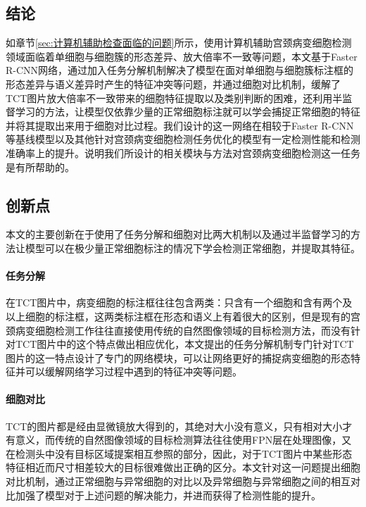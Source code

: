 \subsection{结论}
\par 如章节\ref{sec:计算机辅助检查面临的问题}所示，使用计算机辅助宫颈病变细胞检测领域面临着单细胞与细胞簇的形态差异、放大倍率不一致等问题，本文基于Faster R-CNN网络，通过加入任务分解机制解决了模型在面对单细胞与细胞簇标注框的形态差异与语义差异时产生的特征冲突等问题，并通过细胞对比机制，缓解了TCT图片放大倍率不一致带来的细胞特征提取以及类别判断的困难，还利用半监督学习的方法，让模型仅依靠少量的正常细胞标注就可以学会捕捉正常细胞的特征并将其提取出来用于细胞对比过程。我们设计的这一网络在相较于Faster R-CNN等基线模型以及其他针对宫颈病变细胞检测任务优化的模型有一定检测性能和检测准确率上的提升。说明我们所设计的相关模块与方法对宫颈病变细胞检测这一任务是有所帮助的。

\subsection{创新点}
\par 本文的主要创新在于使用了任务分解和细胞对比两大机制以及通过半监督学习的方法让模型可以在极少量正常细胞标注的情况下学会检测正常细胞，并提取其特征。

\paragraph{任务分解}
\par 在TCT图片中，病变细胞的标注框往往包含两类：只含有一个细胞和含有两个及以上细胞的标注框，这两类标注框在形态和语义上有着很大的区别，但是现有的宫颈病变细胞检测工作往往直接使用传统的自然图像领域的目标检测方法，而没有针对TCT图片中的这个特点做出相应优化，本文提出的任务分解机制专门针对TCT图片的这一特点设计了专门的网络模块，可以让网络更好的捕捉病变细胞的形态特征并可以缓解网络学习过程中遇到的特征冲突等问题。

\paragraph{细胞对比}
\par TCT的图片都是经由显微镜放大得到的，其绝对大小没有意义，只有相对大小才有意义，而传统的自然图像领域的目标检测算法往往使用FPN层在处理图像，又在检测头中没有目标区域提案相互参照的部分，因此，对于TCT图片中某些形态特征相近而尺寸相差较大的目标很难做出正确的区分。本文针对这一问题提出细胞对比机制，通过正常细胞与异常细胞的对比以及异常细胞与异常细胞之间的相互对比加强了模型对于上述问题的解决能力，并进而获得了检测性能的提升。

